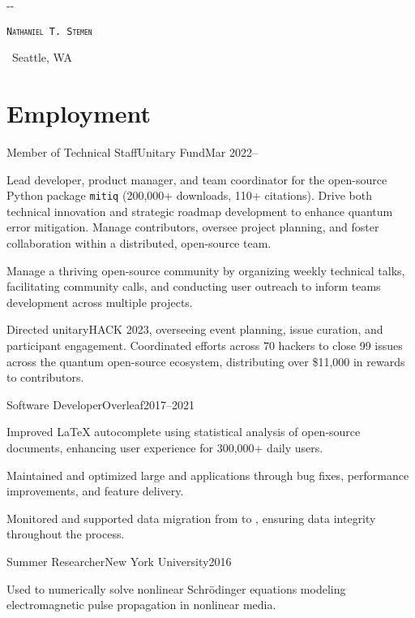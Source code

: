 \documentclass{cultvoucher}
\begin{document}
\begin{adjustwidth}{\dimexpr-\marginparsep-\marginparwidth}{}
	\begin{center}
		\textsc{\texttt{\HUGE Nathaniel T. Stemen}}

		 \separator{}\, Seattle, WA
	\end{center}
\end{adjustwidth}

\section{Employment}

\begin{entry}{Member of Technical Staff}{Unitary Fund}{Mar 2022--}
	\item Lead developer, product manager, and team coordinator for the open-source Python package \texttt{mitiq} (200,000+ downloads, 110+ citations).
		Drive both technical innovation and strategic roadmap development to enhance quantum error mitigation.
		Manage contributors, oversee project planning, and foster collaboration within a distributed, open-source team.
	\item Manage a thriving open-source community by organizing weekly technical talks, facilitating community calls, and conducting user outreach to inform teams development across multiple projects.
    \item Directed unitaryHACK 2023, overseeing event planning, issue curation, and participant engagement.
		Coordinated efforts across 70 hackers to close 99 issues across the quantum open-source ecosystem, distributing over \$11,000 in rewards to contributors.
\end{entry}

\begin{entry}{Software Developer}{Overleaf}{2017--2021}
    \item Improved \LaTeX{} autocomplete using statistical analysis of open-source documents, enhancing user experience for 300,000+ daily users.
    \item Maintained and optimized large  and  applications through bug fixes, performance improvements, and feature delivery.
    \item Monitored and supported data migration from  to , ensuring data integrity throughout the process.
\end{entry}

\begin{entry}{Summer Researcher}{New York University}{2016}
	\item Used  to numerically solve nonlinear Schr\"{o}dinger equations modeling electromagnetic pulse propagation in nonlinear media.
\end{entry}
\end{document}
